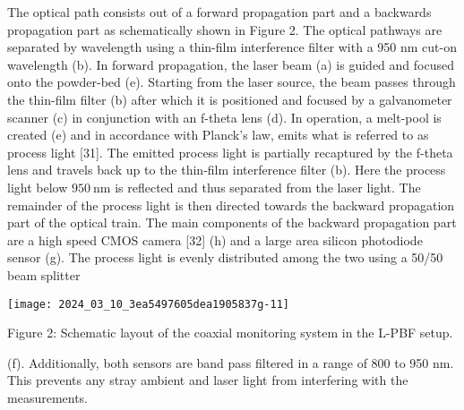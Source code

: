 \documentclass[10pt]{article}
\begin{document}
The optical path consists out of a forward propagation part and a backwards propagation part as schematically shown in Figure 2. The optical pathways are separated by wavelength using a thin-film interference filter with a 950 $\mathrm{nm}$ cut-on wavelength (b). In forward propagation, the laser beam (a) is guided and focused onto the powder-bed (e). Starting from the laser source, the beam passes through the thin-film filter (b) after which it is positioned and focused by a galvanometer scanner (c) in conjunction with an f-theta lens (d). In operation, a melt-pool is created (e) and in accordance with Planck's law, emits what is referred to as process light [31]. The emitted process light is partially recaptured by the f-theta lens and travels back up to the thin-film interference filter (b). Here the process light below $950 \mathrm{~nm}$ is reflected and thus separated from the laser light. The remainder of the process light is then directed towards the backward propagation part of the optical train. The main components of the backward propagation part are a high speed CMOS camera [32] (h) and a large area silicon photodiode sensor (g). The process light is evenly distributed among the two using a 50/50 beam splitter

\begin{center}
\texttt{[image: 2024\_03\_10\_3ea5497605dea1905837g-11]}
\end{center}

Figure 2: Schematic layout of the coaxial monitoring system in the L-PBF setup.

(f). Additionally, both sensors are band pass filtered in a range of 800 to 950 $\mathrm{nm}$. This prevents any stray ambient and laser light from interfering with the measurements.
\end{document}

